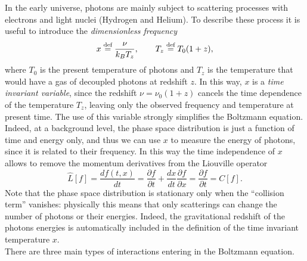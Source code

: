 In the early universe, photons are mainly subject to scattering processes with electrons and light nuclei (Hydrogen and Helium). To describe these process it is useful to introduce the \emph{dimensionless frequency}
\begin{equation}\label{eq:dimensionless_frequency}
    x\stackrel{\text{def}}{=}\frac{\nu}{k_BT_z},\qquad T_z\stackrel{\text{def}}{=} T_0(1+z),
\end{equation}
where $T_0$ is the present temperature of photons and $T_z$ is the temperature that would have a gas of decoupled photons at redshift $z$. In this way, $x$ is a \emph{time invariant variable}, since the redshift $\nu=\nu_0(1+z)$ cancels the time dependence of the temperature $T_z$, leaving only the observed frequency and temperature at present time. The use of this variable strongly simplifies the Boltzmann equation. Indeed, at a background level, the phase space distribution is just a function of time and energy only, and thus we can use $x$ to measure the energy of photons, since it is related to their frequency. In this way the time independence of $x$ allows to remove the momentum derivatives from the Liouville operator $$ \hat{L}[f]=\frac{df(t,x)}{dt}=\frac{\partial f}{\partial t}+\frac{dx}{dt}\frac{\partial f}{\partial x}=\frac{\partial f}{\partial t}=C[f].$$
Note that the phase space distribution is stationary only when the ``collision term'' vanishes: physically this means that only scatterings can change the number of photons or their energies. Indeed, the gravitational redshift of the photons energies is automatically included in the definition of the time invariant temperature $x$.\\
There are three main types of interactions entering in the Boltzmann equation.
